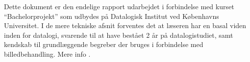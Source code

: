 {
{\sffamily Dette dokument er den endelige rapport udarbejdet i
forbindelse med kurset ``Bachelorprojekt'' som udbydes på Datalogisk
Institut ved Københavns Universitet. I de mere tekniske afsnit forventes
det at læseren har en basal viden inden for datalogi, svarende til at
have bestået 2 år på datalogistudiet, samt kendskab til grundlæggende
begreber der bruges i forbindelse med billedbehandling. Mere info
\cite{SIOlsen}.

}
}


